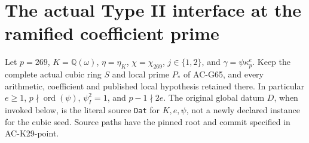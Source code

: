\section{The actual Type II interface at the ramified coefficient prime}
\label{sec:cubic-269-typeii-interface}

Let \(p=269\), \(K=\mathbb Q(\omega)\),
\(\eta=\eta_K\), \(\chi=\chi_{269}\),
\(j\in\{1,2\}\), and \(\gamma=\psi\kappa_p^e\).
Keep the complete actual cubic ring \(S\) and local prime
\(P_*\) of AC-G65, and every arithmetic, coefficient and
published local hypothesis retained there. In particular
\(e\ge1\), \(p\nmid\operatorname{ord}(\psi)\),
\(\psi_I^2=1\), and \(p-1\nmid2e\).
The original global datum \(D\), when invoked below, is the
literal source \texttt{Dat} for \(K,e,\psi\), not a newly
declared instance for the cubic seed. Source paths have the
pinned root and commit specified in AC-K29-point.

